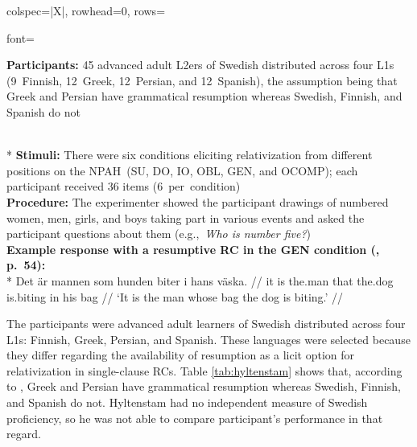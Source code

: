 
\begin{longtblr}[caption={\textcite{hyltenstam1984,hyltenstam1990}: Oral RC elicitation task}, label={tblr:hyltenstam}]{colspec={|X|}, rowhead=0, rows={font=\raggedright{}}}\hline
\textbf{Participants:} 45 advanced adult L2ers of Swedish distributed across four L1s (9~Finnish, 12~Greek, 12~Persian, and 12~Spanish), the assumption being that Greek and Persian have grammatical resumption whereas Swedish, Finnish, and Spanish do not \vspace{5pt}\rule{0pt}{10pt}\\*
\textbf{Stimuli:} There were six conditions eliciting relativization from different positions on the NPAH~(SU, DO, IO, OBL, GEN, and OCOMP); each participant received 36 items (6~per~condition) \vspace{5pt}\\
\textbf{Procedure:} The experimenter showed the participant drawings of numbered women, men, girls, and boys taking part in various events and asked the participant questions about them (e.g.,~\textit{Who is number five?}) \vspace{5pt}\\
\textbf{Example response with a resumptive RC in the GEN condition (\cite{hyltenstam1984}, p.~54):} \vspace{5pt}\\*
\setlength{\leftskip}{10pt}\begingl
\gla \ljudge*Det är mannen som hunden biter i hans väska. //
\glb it is the.man that the.dog is.biting in his bag //
\glft `It is the man whose bag the dog is biting.' //
\endgl
\\\hline
\end{longtblr}

The participants were advanced adult learners of Swedish distributed across four L1s: Finnish, Greek, Persian, and Spanish. These languages were selected because they differ regarding the availability of resumption as a licit option for relativization in single-clause RCs. Table \ref{tab:hyltenstam} shows that, according to \textcite{keenan.comrie1977}, Greek and Persian have grammatical resumption whereas Swedish, Finnish, and Spanish do not. Hyltenstam had no independent measure of Swedish proficiency, so he was not able to compare participant's performance in that regard.

